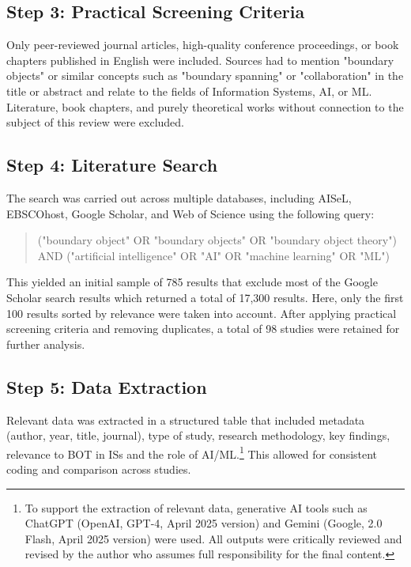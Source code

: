 \documentclass[12pt,oneside]{article}
\begin{document}
\subsection{Step 3: Practical Screening Criteria}
Only peer-reviewed journal articles, high-quality conference proceedings, or book chapters published in English were included. Sources had to mention 
"boundary objects" or similar concepts such as "boundary spanning" or "collaboration" in the title or abstract and relate to the fields of Information 
Systems, \ac{AI}, or \ac{ML}. Literature, book chapters, and purely theoretical works without connection to the subject of this review were excluded.

\subsection{Step 4: Literature Search}
The search was carried out across multiple databases, including AISeL, EBSCOhost, Google Scholar, and Web of Science using the following query:

\begin{quote}
\raggedright
\begin{ttfamily}
("boundary object" OR "boundary objects" OR "boundary object theory") AND ("artificial intelligence" OR "AI" OR "machine learning" OR "ML")
\end{ttfamily}
\end{quote}

This yielded an initial sample of 785 results that exclude most of the Google Scholar search results which returned a total of 17,300 results. Here, only 
the first 100 results sorted by relevance were taken into account. After applying practical screening criteria and removing duplicates, a total of 98 
studies were retained for further analysis.

\subsection{Step 5: Data Extraction}
Relevant data was extracted in a structured table that included metadata (author, year, title, journal), type of study, research methodology, key 
findings, relevance to \ac{BOT} in \ac{IS}s and the role of \ac{AI}/\ac{ML}.\footnote{To support the extraction of relevant data, generative AI tools such as ChatGPT (OpenAI, GPT-4, April 2025 version) and Gemini (Google, 2.0 Flash, April 2025 version) were used. All outputs were critically reviewed and revised by the author who assumes full responsibility for the final content.} This allowed for consistent coding and comparison across studies.
\end{document}
